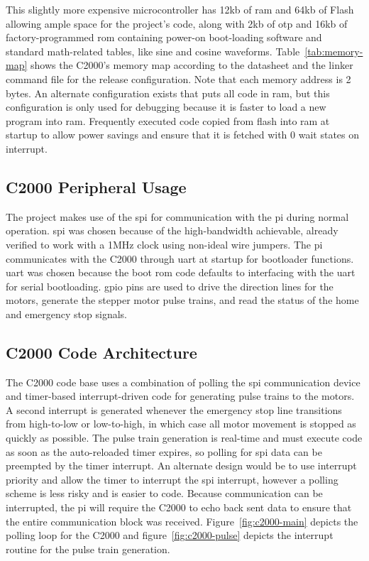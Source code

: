 This slightly more expensive microcontroller has 12\gls{kb} of \gls{ram} and 64\gls{kb} of Flash allowing ample space for the project's code, along with 2\gls{kb} of \gls{otp} and 16\gls{kb} of factory-programmed \gls{rom} containing power-on boot-loading software and standard math-related tables, like sine and cosine waveforms.
Table~\ref{tab:memory-map} shows the C2000's memory map according to the datasheet\cite{piccolo} and the linker command file for the release configuration.
Note that each memory address is 2 bytes. 
An alternate configuration exists that puts all code in \gls{ram}, but this configuration is only used for debugging because it is faster to load a new program into \gls{ram}.
Frequently executed code copied from flash into \gls{ram} at startup to allow power savings and ensure that it is fetched with 0 wait states on interrupt.

\subsection{C2000 Peripheral Usage}
The project makes use of the \gls{spi} for communication with the \gls{pi} during normal operation.
\gls{spi} was chosen because of the high-bandwidth achievable, already verified to work with a 1MHz clock using non-ideal wire jumpers.
The \gls{pi} communicates with the C2000 through \gls{uart} at startup for bootloader functions.
\gls{uart} was chosen because the boot \gls{rom} code defaults to interfacing with the \gls{uart} for serial bootloading.
\gls{gpio} pins are used to drive the direction lines for the motors, generate the stepper motor pulse trains, and read the status of the home and emergency stop signals.

\subsection{C2000 Code Architecture}
The C2000 code base uses a combination of polling the \gls{spi} communication device and timer-based interrupt-driven code for generating pulse trains to the motors.
A second interrupt is generated whenever the emergency stop line transitions from high-to-low or low-to-high, in which case all motor movement is stopped as quickly as possible.
The pulse train generation is real-time and must execute code as soon as the auto-reloaded timer expires, so polling for \gls{spi} data can be preempted by the timer interrupt.
An alternate design would be to use interrupt priority and allow the timer to interrupt the \gls{spi} interrupt, however a polling scheme is less risky and is easier to code.
Because communication can be interrupted, the \gls{pi} will require the C2000 to echo back sent data to ensure that the entire communication block was received.
Figure~\ref{fig:c2000-main} depicts the polling loop for the C2000 and figure~\ref{fig:c2000-pulse} depicts the interrupt routine for the pulse train generation.

